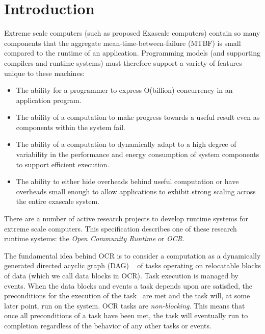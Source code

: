 %

\chapter{Introduction}
\label{chap:introduction}
Extreme scale computers (such as proposed Exascale computers) contain
so many components that the aggregate mean-time-between-failure (MTBF)
is small
compared to the runtime of an application. Programming models (and
supporting compilers and runtime systems) must therefore support a
variety of features unique to these machines:
\begin{itemize}
\item The ability for a programmer to
express O(billion) concurrency in an application program.

\item The ability of a computation to make progress towards a useful
result even as components within the system fail.

\item The ability of a computation to dynamically adapt to a high
degree of variability in the performance and energy consumption of
system components to support efficient execution.

\item The ability to either hide overheads behind useful computation
or have overheads small enough to allow applications to exhibit strong
scaling across the entire exascale system.

\end{itemize}

There are a number of active research projects to develop runtime systems
for extreme scale computers. This specification describes one of
these research runtime systems: the \emph{Open Community Runtime} or \emph{OCR}.

The fundamental idea behind OCR is to consider a computation as a
dynamically generated directed acyclic graph (DAG) ~\cite{
TaSa11,Tasirlar11,Zuckerman:2011:UCP:2000417.2000424} of tasks
operating on relocatable blocks of data (which we call data blocks in
OCR). Task execution is managed by events.
When the data blocks and events a task depends upon are satisfied, the
preconditions for the execution of the task~\cite{SSWS13} are met and the
task will, at some later point, run on the system. OCR tasks are
\emph{non-blocking}. This means that once all
preconditions of a task have been met, the task will eventually run to completion
regardless of the behavior of any other tasks or events.

